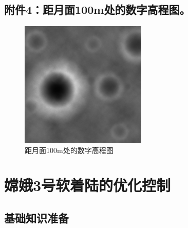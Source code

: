    \subsection{附件4：距月面100m处的数字高程图。}
            \begin{figure}[H]
            \centering
            \includegraphics[width=6cm]{images/100m_number2.png}
            \caption{距月面100m处的数字高程图}
            \label{fig:距月面100m处的数字高程图}
            \end{figure}
\section{嫦娥3号软着陆的优化控制}
    \subsection{基础知识准备}
